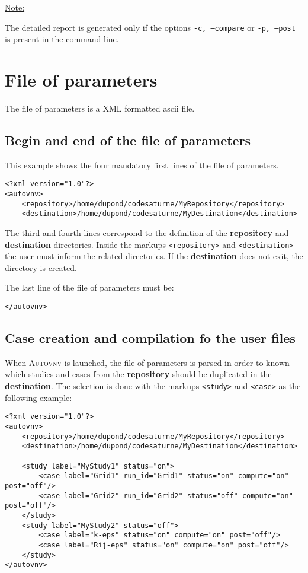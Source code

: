 \documentclass[a4paper,10pt,twoside]{csshortdoc}
\begin{document}
\underline{Note:}

The detailed report is generated only if the options \texttt{-c, --compare}
or \texttt{-p, --post} is present in the command line.

\section{File of parameters}

The file of parameters is a XML formatted ascii file.

\subsection{Begin and end of the file of parameters}

This example shows the four mandatory first lines of the file of parameters.

\small
\begin{verbatim}
<?xml version="1.0"?>
<autovnv>
    <repository>/home/dupond/codesaturne/MyRepository</repository>
    <destination>/home/dupond/codesaturne/MyDestination</destination>
\end{verbatim}
\normalsize

The third and fourth lines correspond to the definition of the
\textbf{repository} and \textbf{destination} directories.
Inside the markups \texttt{<repository>} and \texttt{<destination>} the user
must inform the related directories. If the \textbf{destination} does not exit,
the directory is created.

The last line of the file of parameters must be:

\small
\begin{verbatim}
</autovnv>
\end{verbatim}
\normalsize

\subsection{Case creation and compilation fo the user files}

When \textsc{Autovnv} is launched, the file of parameters is parsed in order to
known which studies and cases from the \textbf{repository} should be duplicated
in the \textbf{destination}. The selection is done with the markups
\texttt{<study>} and \texttt{<case>} as the following example:

\small
\begin{verbatim}
<?xml version="1.0"?>
<autovnv>
    <repository>/home/dupond/codesaturne/MyRepository</repository>
    <destination>/home/dupond/codesaturne/MyDestination</destination>

    <study label="MyStudy1" status="on">
        <case label="Grid1" run_id="Grid1" status="on" compute="on" post="off"/>
        <case label="Grid2" run_id="Grid2" status="off" compute="on" post="off"/>
    </study>
    <study label="MyStudy2" status="off">
        <case label="k-eps" status="on" compute="on" post="off"/>
        <case label="Rij-eps" status="on" compute="on" post="off"/>
    </study>
</autovnv>
\end{verbatim}
\normalsize
\end{document}
